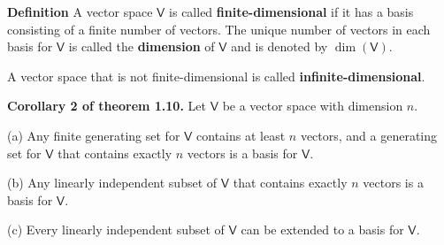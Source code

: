 \documentclass{article}
\newcommand{\0}{\mathit{0}}
\begin{document}
\medskip

\textbf{Definition}
A vector space $\mathsf{V}$ is called \textbf{finite-dimensional} if it has a basis
consisting of a finite number of vectors. The unique number of vectors in each
basis for $\mathsf{V}$ is called the \textbf{dimension} of $\mathsf{V}$ and is denoted
by $\dim(\mathsf{V})$.

A vector space that is not finite-dimensional is called \textbf{infinite-dimensional}.

\medskip

\textbf{Corollary 2 of theorem 1.10.} Let $\mathsf{V}$ be a vector space with dimension $n$.

(a) Any finite generating set for $\mathsf{V}$ contains at least $n$ vectors, 
and a generating set for $\mathsf{V}$ that contains exactly $n$ vectors 
is a basis for $\mathsf{V}$.

(b) Any linearly independent subset of $\mathsf{V}$ that contains exactly 
$n$ vectors is a basis for $\mathsf{V}$.

(c) Every linearly independent subset of $\mathsf{V}$ can be extended to 
a basis for $\mathsf{V}$.
\end{document}

